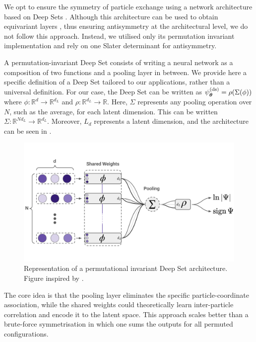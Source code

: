 We opt to ensure the symmetry of particle exchange using a network architecture based on Deep Sets \cite{zaheer2017deep}. Although this architecture can be used to obtain equivariant layers \cite{jane,drissifermion}, thus ensuring antisymmetry at the architectural level, we do not follow this approach. Instead, we utilised only its permutation invariant implementation and rely on one Slater determinant for antisymmetry.

A permutation-invariant Deep Set consists of writing a neural network as a composition of two functions and a pooling layer in between. We provide here a specific definition of a Deep Set tailored to our applications, rather than a universal definition. For our case, the Deep Set can be written as $\psi_{\boldsymbol{\theta}}^{(\text{ds})} =\rho (\Sigma ( \phi))  $ where $\phi: \mathbb{R}^d \to \mathbb{R}^{d_L}$ and $\rho: \mathbb{R}^{d_L} \to \mathbb{R}$. Here, $\Sigma$ represents any pooling operation over $N$, such as the average, for each latent dimension. This can be written $\Sigma :\mathbb{R}^{Nd_L} \to \mathbb{R}^{d_L}$. Moreover, $L_d$ represents a latent dimension, and the architecture can be seen in .

\begin{figure}[H]
    \centering
    \includegraphics[width=0.9\linewidth]{Chapters/Methods/images/deepset_img.pdf}
    \caption{Representation of a permutational invariant Deep Set architecture. Figure inspired by \cite{jane}.}
    \label{fig:deepset}
\end{figure}

The core idea is that the pooling layer eliminates the specific particle-coordinate association, while the shared weights could theoretically learn inter-particle correlation and encode it to the latent space. This approach scales better than a brute-force symmetrisation in which one sums the outputs for all permuted configurations.

